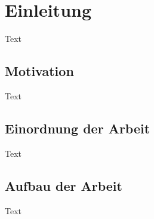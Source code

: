 \chapter{Einleitung}
\label{chap:01_einleitung}

   Text

   \section{Motivation}
   \label{sec:01_motivation}
   
      Text
      
   \section{Einordnung der Arbeit}
   \label{sec:01_einordnung}
      
      Text
      
   \section{Aufbau der Arbeit}
   \label{sec:01_aufbau}
   
      Text